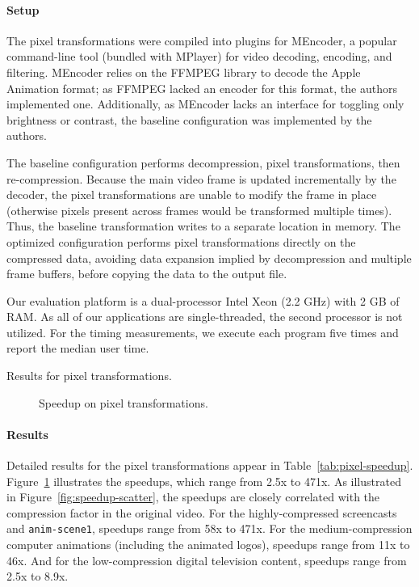 \paragraph*{Setup}  The pixel transformations were compiled into plugins for
MEncoder, a popular command-line tool (bundled with MPlayer) for video
decoding, encoding, and filtering.  MEncoder relies on the FFMPEG
library to decode the Apple Animation format; as FFMPEG lacked an
encoder for this format, the authors implemented one.  Additionally,
as MEncoder lacks an interface for toggling only brightness or
contrast, the baseline configuration was implemented by the authors.

The baseline configuration performs decompression, pixel
transformations, then re-compression.  Because the main video frame is
updated incrementally by the decoder, the pixel transformations are
unable to modify the frame in place (otherwise pixels present across
frames would be transformed multiple times).  Thus, the baseline
transformation writes to a separate location in memory.  The optimized
configuration performs pixel transformations directly on the
compressed data, avoiding data expansion implied by decompression and
multiple frame buffers, before copying the data to the output file.

Our evaluation platform is a dual-processor Intel Xeon (2.2 GHz) with
2 GB of RAM.  As all of our applications are single-threaded, the
second processor is not utilized.  For the timing measurements, we
execute each program five times and report the median user time.

\begin{table*}[t!]
\hspace{-0.26in}
\vspace{-12pt}
\caption[Table of results for pixel transformations]{Results for pixel transformations.
\protect\label{tab:pixel-speedup}}
\end{table*}

\begin{figure}[t!]
\centering
{}
\caption[Speedup graph for pixel transformations]{Speedup on pixel transformations.
\protect\label{fig:pixel-speedup}}
\end{figure}

\paragraph*{Results}  Detailed results for the pixel transformations appear
in Table~\ref{tab:pixel-speedup}.  Figure~\ref{fig:pixel-speedup}
illustrates the speedups, which range from 2.5x to 471x.  As
illustrated in Figure~\ref{fig:speedup-scatter}, the speedups are
closely correlated with the compression factor in the original video.
For the highly-compressed screencasts and {\tt anim-scene1}, speedups
range from 58x to 471x.  For the medium-compression computer
animations (including the animated logos), speedups range from 11x to
46x.  And for the low-compression digital television content, speedups
range from 2.5x to 8.9x.

